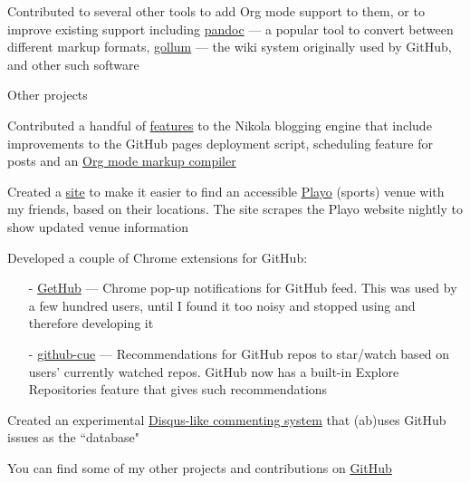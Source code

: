 \begin{cventries}
{\begin{cvitems}
        \item{Contributed to several other tools to add Org mode support to them, or to improve existing support including \href{https://github.com/jgm/pandoc/commits?author=punchagan}{pandoc} --- a popular tool to convert between different markup formats, \href{https://github.com/gollum/gollum/commits?author=punchagan}{gollum} --- the wiki system originally used by GitHub, and other such software}
        \end{cvitems}
      }
  \cventry
      {Other projects}
      {}
      {} %
      {} %
      {
        \begin{cvitems} %
        \item {Contributed a handful of \href{https://github.com/getnikola/nikola/commits?author=punchagan}{features} to the Nikola blogging engine that include improvements to the GitHub pages deployment script, scheduling feature for posts and an \href{https://github.com/getnikola/plugins/tree/master/v8/orgmode}{Org mode markup compiler}}
        \item {Created a \href{https://punchagan.github.io/playo-find-venue/}{site} to make it easier to find an accessible \href{https://playo.co/}{Playo} (sports) venue with my friends, based on their locations. The site scrapes the Playo website nightly to show updated venue information}
        \item {Developed a couple of Chrome extensions for GitHub:
          \begin{itemize}[leftmargin=2ex, nosep, noitemsep]
          \item[-] {\href{https://github.com/punchagan/GetHub}{GetHub} --- Chrome pop-up notifications for GitHub feed. This was used by a few hundred users, until I found it too noisy and stopped using and therefore developing it}
          \item[-] {\href{https://github.com/punchagan/github-cue}{github-cue} --- Recommendations for GitHub repos to star/watch based on users' currently watched repos. GitHub now has a built-in Explore Repositories feature that gives such recommendations}
          \end{itemize}
        }
        \item {Created an experimental \href{https://github.com/punchagan/crumb}{Disqus-like commenting system} that (ab)uses GitHub issues as the ``database"}
        \item {You can find some of my other projects and contributions on \href{https://github.com/punchagan}{GitHub}}
        \end{cvitems}
      }
\end{cventries}

